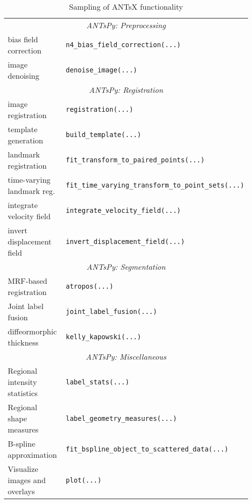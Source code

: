 
\begin{table}
  \small
   \centering
   \vspace{-0.25cm}
   \caption{Sampling of ANTsX functionality} 
   \begin{tabular*}{0.95\textwidth}{l @{\extracolsep{\fill}} p{}}
    \toprule
    \multicolumn{2}{c}{\cellcolor{gray!25} \em ANTsPy: Preprocessing} \\
    \cmidrule[1pt](lr){1-2}
    bias field correction & \texttt{n4\_bias\_field\_correction(...)} \\
    image denoising  & \texttt{denoise\_image(...)} \\
    \cmidrule[1pt](lr){1-2}
    \multicolumn{2}{c}{\cellcolor{gray!25} \em ANTsPy: Registration} \\
    \cmidrule[1pt](lr){1-2}
    image registration & \texttt{registration(...)} \\
    template generation  & \texttt{build\_template(...)} \\
    landmark registration & \texttt{fit\_transform\_to\_paired\_points(...)} \\
    time-varying landmark reg. & \texttt{fit\_time\_varying\_transform\_to\_point\_sets(...)} \\
    integrate velocity field & \texttt{integrate\_velocity\_field(...)} \\
    invert displacement field & \texttt{invert\_displacement\_field(...)} \\
    \cmidrule[1pt](lr){1-2}
    \multicolumn{2}{c}{\cellcolor{gray!25} \em ANTsPy: Segmentation} \\
    \cmidrule[1pt](lr){1-2}
    MRF-based registration & \texttt{atropos(...)} \\
    Joint label fusion & \texttt{joint\_label\_fusion(...)} \\
    diffeormorphic thickness   & \texttt{kelly\_kapowski(...)} \\
    \cmidrule[1pt](lr){1-2}
    \multicolumn{2}{c}{\cellcolor{gray!25} \em ANTsPy: Miscellaneous} \\
    \cmidrule[1pt](lr){1-2}
    Regional intensity statistics & \texttt{label\_stats(...)} \\
    Regional shape measures & \texttt{label\_geometry\_measures(...)} \\
    B-spline approximation & \texttt{fit\_bspline\_object\_to\_scattered\_data(...)} \\
    Visualize images and overlays\,\,\,\,\,\,\,\,\,\,\,\, & \texttt{plot(...)} \\

\end{tabular*}
\end{table}
